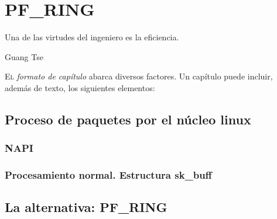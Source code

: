 \chapter{PF\_RING}
\pagestyle{esitscCD}
\epigraph{ Una de las virtudes del ingeniero es la eficiencia.  }{Guang Tse}

\lettrine[lraise=-0.1, lines=2, loversize=0.25]{E}l \emph{formato de capítulo } abarca diversos factores. Un capítulo puede incluir, además de texto, los siguientes 
elementos:

% 

\section{Proceso de paquetes por el núcleo linux}
\subsection{NAPI}

\subsection{Procesamiento normal. Estructura sk\_buff}
\section{La alternativa: PF\_RING}

